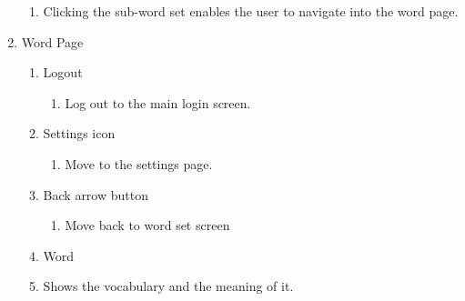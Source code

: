 \documentclass[conference]{IEEEtran}
\begin{document}
\begin{enumerate}
\begin{enumerate}
            \item Clicking the sub-word set enables the user to navigate into the word page.
            \end{enumerate}
        \item Word Page
            \begin{enumerate}
                \item Logout
                \begin{enumerate}
                    \item Log out to the main login screen.
                \end{enumerate}
                \item Settings icon
                \begin{enumerate}
                    \item Move to the settings page.
                \end{enumerate}
                \item Back arrow button
                \begin{enumerate}
                    \item Move back to word set screen
                \end{enumerate}
                \item Word
                    \item Shows the vocabulary and the meaning of it.

\end{enumerate}
\end{enumerate}
\end{document}
